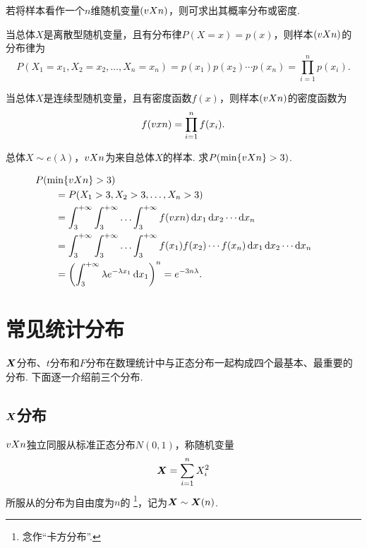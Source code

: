 若将样本看作一个\(n\)维随机变量\((v{X}{n})\)，则可求出其概率分布或密度.

当总体\(X\)是离散型随机变量，且有分布律\(P(X = x) = p(x)\)，则样本\((v{X}{n})\)的分布律为\[
P(X_1=x_1,X_2=x_2,\dotsc,X_n=x_n)
= p(x_1) p(x_2) \dotsm p(x_n)
= \prod_{i=1}^n p(x_i).
\]

当总体\(X\)是连续型随机变量，且有密度函数\(f(x)\)，则样本\((v{X}{n})\)的密度函数为\[
f(v{x}{n}) = \prod_{i=1}^n f(x_i).
\]

\begin{example}
总体\(X \sim e(\lambda)\)，\(v{X}{n}\)为来自总体\(X\)的样本.
\def\P{P(\min\{\v{X}{n}\}>3)}
求\(\P\).
\begin{solution}
\def\intx{\int_3^{+\infty}}
\def\into{\intx \intx \dotso \intx}
\def\ddx{\dd{x_1} \dd{x_2} \dotsm \dd{x_n}}
\begin{align*}
&\hspace{-20pt}\P \\
&= P(X_1>3,X_2>3,\dotsc,X_n>3) \\
&= \into f(\v{x}{n}) \ddx \\
&= \into f(x_1) f(x_2) \dotsm f(x_n) \ddx \\
&= \left( \intx \lambda e^{-\lambda x_1} \dd{x_1} \right)^n
= e^{-3n\lambda}.
\end{align*}
\end{solution}
\end{example}

\section{常见统计分布}
\(\boldsymbol{X}\)分布、\(t\)分布和\(F\)分布在数理统计中与正态分布一起构成四个最基本、最重要的分布.
下面逐一介绍前三个分布.

\subsection{\texorpdfstring{\(\boldsymbol{X}\)}{卡方}分布}
\begin{definition}\label{definition:数理统计的基础知识.卡方分布的定义}
\(v{X}{n}\)独立同服从标准正态分布\(N(0,1)\)，称随机变量\[
\boldsymbol{X} = \sum\limits_{i=1}^n{X_i^2}
\]所服从的分布为自由度为\(n\)的  \footnote{念作“卡方分布”.}，记为\(\boldsymbol{X} \sim \boldsymbol{X}(n)\).
\end{definition}

